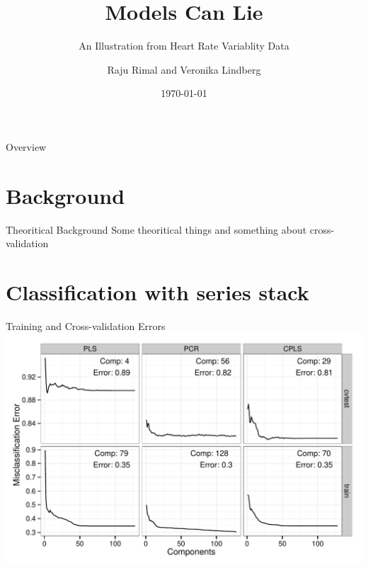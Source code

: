 \documentclass[newPxFont]{beamer}\usepackage[]{graphicx}\usepackage[]{color}
\title{Models Can Lie}
\subtitle{An Illustration from Heart Rate Variablity Data}
\date{\today}
\author{Raju Rimal and Veronika Lindberg}
\institute{Norwegian University of Life Sciences}
\makeatletter
\def\maxwidth{ %
  \ifdim\Gin@nat@width>\linewidth
    \linewidth
  \else
    \Gin@nat@width
  \fi
}
\newenvironment{knitrout}{}{} %
\makeatother
\begin{document}
%
%

\maketitle

%
%



%
%
\begin{frame}{Overview}
\tableofcontents
\end{frame}

\section{Background}
\begin{frame}[c, fragile]{Theoritical Background}
Some theoritical things and something about cross-validation

\end{frame}

\section{Classification with series stack}






\begin{frame}[t]{Training and Cross-validation Errors}
\begin{knitrout}
\color{fgcolor}
\includegraphics[width=\maxwidth]{figure/Set1ErrorPlot__errPlot-1} 

\end{knitrout}
\end{frame}
\end{document}
